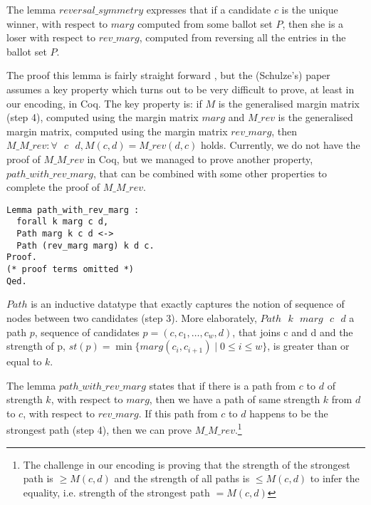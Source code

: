 \documentclass[compsoc,conference,a4paper,10pt,times]{IEEEtran}
\begin{document}
\noindent
The lemma $reversal\_symmetry$ expresses that if a candidate $c$ is the unique 
winner, with respect to $marg$ computed from some ballot set $P$, then she is 
a loser with respect to $rev\_marg$, computed from reversing all the entries 
in the ballot set $P$.

\noindent
The proof this lemma is fairly straight forward \cite{Schulze:2011:NMC}, but 
the (Schulze's) paper assumes a key property which turns out to be very difficult to prove, 
at least in our encoding, in Coq. The key property is: if $M$ 
is the generalised margin 
matrix (step 4), computed using the margin matrix $marg$ and $M\_rev$ is the generalised 
margin matrix, computed using the margin matrix $rev\_marg$, then 
$M\_M\_rev: \forall \text{ } c \text{ } d,  M(c, d) = M\_rev (d, c)$ holds. Currently, 
we do not have the proof of $M\_M\_rev$ in Coq, but we managed to prove 
another property, $path\_with\_rev\_marg$, that can be combined with 
some other properties to complete the proof of $M\_M\_rev$. 

\begin{verbatim}
Lemma path_with_rev_marg :
  forall k marg c d,
  Path marg k c d <->  
  Path (rev_marg marg) k d c.
Proof.
(* proof terms omitted *)  
Qed.
\end{verbatim}

\noindent
$Path$ is an inductive datatype that exactly captures the notion of 
sequence of nodes between two candidates (step 3). More elaborately, 
$Path \text{ }k \text{ }marg \text{ }c \text{ }d$ a path $p$, sequence of candidates 
$p= (c,c_{1}, \dots ,c_{w},d)$, that joins c and d and the strength of 
p, $st(p) =  \min \lbrace marg (c_i, c_{i+1}) \mid 0 
\leq i \leq w \rbrace$, is greater than or equal to $k$. 

\noindent
The lemma $path\_with\_rev\_marg$ states that if there is a path from 
$c$ to $d$ of strength $k$, with respect to $marg$, then we have 
a path of same strength $k$ from $d$ to $c$, with respect to $rev\_marg$. 
If this path from $c$ to $d$ happens to be the strongest path (step 4), 
then we can prove $M\_M\_rev$.\footnote{The challenge in our encoding 
is proving that the strength of the strongest path is $\geq  M(c, d)$ and 
the strength of all paths is $\leq M(c, d)$ to infer the equality, 
i.e. strength of the strongest path $= M(c, d)$}



\end{document}
